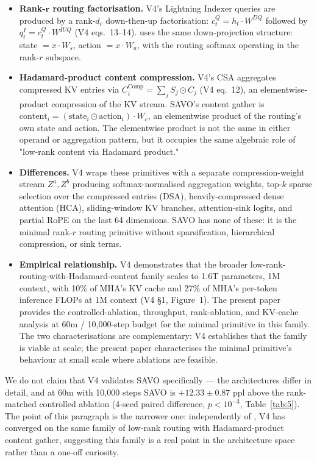 \begin{itemize}
  \item \textbf{Rank-$\boldsymbol{r}$ routing factorisation.} V4's Lightning Indexer queries are produced by a rank-$d_c$ down-then-up factorisation: $c^Q_t = h_t \cdot W^{DQ}$ followed by $q^I_t = c^Q_t \cdot W^{IUQ}$ (V4 eqs.\ 13--14). \QC{} uses the same down-projection structure: state $= x \cdot W_s$, action $= x \cdot W_a$, with the routing softmax operating in the rank-$r$ subspace.
  \item \textbf{Hadamard-product content compression.} V4's CSA aggregates compressed KV entries via $C^{\mathrm{Comp}}_i = \sum_j S_j \odot C_j$ (V4 eq.\ 12), an elementwise-product compression of the KV stream. SAVO's content gather is $\mathrm{content}_i = (\mathrm{state}_i \odot \mathrm{action}_i) \cdot W_c$, an elementwise product of the routing's own state and action. The elementwise product is not the same in either operand or aggregation pattern, but it occupies the same algebraic role of "low-rank content via Hadamard product."
  \item \textbf{Differences.} V4 wraps these primitives with a separate compression-weight stream $Z^a, Z^b$ producing softmax-normalised aggregation weights, top-$k$ sparse selection over the compressed entries (DSA), heavily-compressed dense attention (HCA), sliding-window KV branches, attention-sink logits, and partial RoPE on the last 64 dimensions. SAVO has none of these: it is the minimal rank-$r$ routing primitive without sparsification, hierarchical compression, or sink terms.
  \item \textbf{Empirical relationship.} V4 demonstrates that the broader low-rank-routing-with-Hadamard-content family scales to 1.6T parameters, 1M context, with 10\% of MHA's KV cache and 27\% of MHA's per-token inference FLOPs at 1M context (V4 \S1, Figure~1). The present paper provides the controlled-ablation, throughput, rank-ablation, and KV-cache analysis at 60m / 10,000-step budget for the minimal primitive in this family. The two characterisations are complementary: V4 establishes that the family is viable at scale; the present paper characterises the minimal primitive's behaviour at small scale where ablations are feasible.
\end{itemize}

We do not claim that V4 validates SAVO specifically --- the architectures differ in detail, and at 60m with 10,000 steps SAVO is $+12.33 \pm 0.87$ ppl above the rank-matched controlled ablation (4-seed paired difference, $p < 10^{-3}$, Table~\ref{tab:5}). The point of this paragraph is the narrower one: independently of \QC{}, V4 has converged on the same family of low-rank routing with Hadamard-product content gather, suggesting this family is a real point in the architecture space rather than a one-off curiosity.


